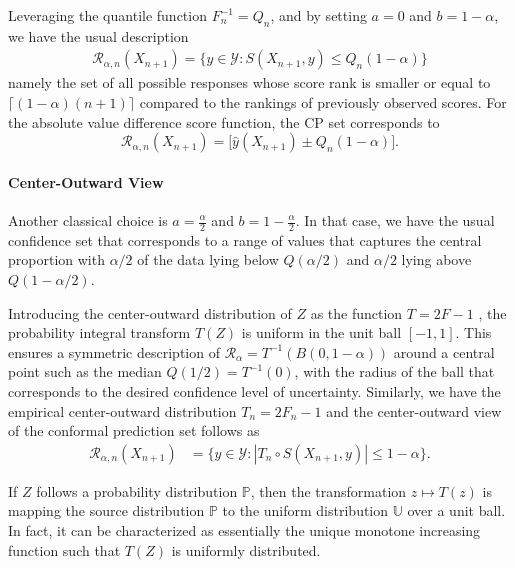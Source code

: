 Leveraging the quantile function $F_{n}^{-1}= Q_n$, and
by setting $a=0$ and $b=1-\alpha$, we have the usual description
\begin{align*}
\mathcal{R}_{\alpha, n}(X_{n+1}) = \big\{y \in \mathcal{Y} : S(X_{n+1}, y) \leq Q_n(1-\alpha) \big\} 
\end{align*}
namely the set of all possible responses whose score rank is smaller or equal to $\lceil (1-\alpha)(n+1) \rceil$ compared to the rankings of previously observed scores. For the absolute value difference score function, the CP set corresponds to 
$$\mathcal{R}_{\alpha, n}(X_{n+1}) = \big[\hat y(X_{n+1}) \pm Q_n(1-\alpha)\big].$$



\paragraph{Center-Outward View}
Another classical choice is $a=\frac{\alpha}{2}$ and $b=1-\frac{\alpha}{2}$. In that case, we have the usual confidence set that corresponds to a range of values that captures the central proportion with $\alpha/2$ of the data lying below $Q(\alpha/2)$ and $\alpha/2$ lying above $Q(1-\alpha/2)$.

Introducing the center-outward distribution of $Z$ as the function $T = 2 F - 1$ , the probability integral transform $T(Z)$ is uniform in the unit ball $[-1, 1]$.
This ensures a symmetric description of 
$
\mathcal{R}_\alpha = T^{-1}(B(0, 1-\alpha))$ around a central point such as the median $Q(1/2) = T^{-1}(0)$,
with the radius of the ball that corresponds to the desired confidence level of uncertainty. Similarly, we have the empirical center-outward distribution $T_{n} = 2 F_n - 1$ and
the center-outward view of the conformal prediction set follows as
\begin{align*}
\mathcal{R}_{\alpha, n}(X_{n+1}) &= \big\{y \in \mathcal{Y} : |T_{n} \circ S(X_{n+1}, y)| \leq 1-\alpha \big\} .
\end{align*}


If $Z$ follows a probability distribution $\mathbb{P}$, then the transformation $z \mapsto T(z)$ is mapping the source  distribution $\mathbb{P}$ to the uniform distribution $\mathbb{U}$ over a unit ball. In fact, it can be characterized as essentially the unique monotone increasing function such that $T(Z)$ is uniformly distributed. 

